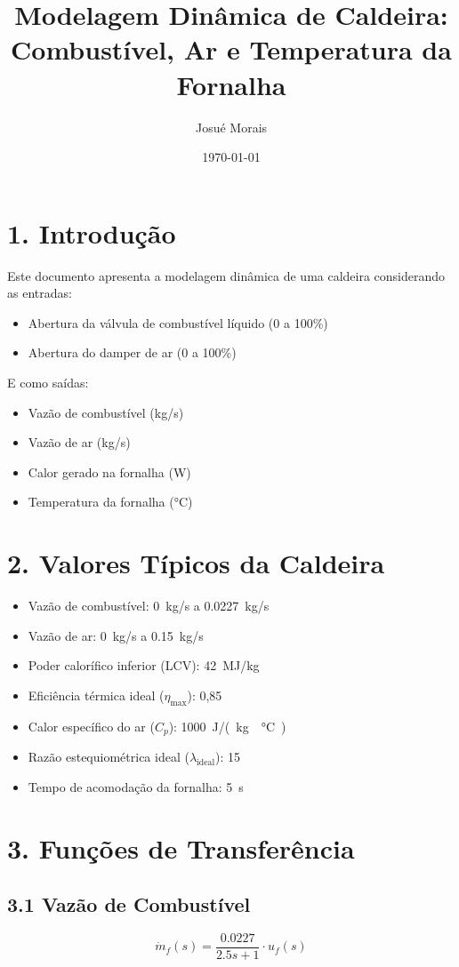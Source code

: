 \documentclass[12pt]{article}
\title{Modelagem Din\^amica de Caldeira: Combust\'ivel, Ar e Temperatura da Fornalha}
\author{Josu\'e Morais}
\date{\today}
\begin{document}
\maketitle

\section*{1. Introdu\c{c}\~ao}
Este documento apresenta a modelagem din\^amica de uma caldeira considerando as entradas:
\begin{itemize}
    \item Abertura da v\'alvula de combust\'ivel l\'iquido (0 a 100\%)
    \item Abertura do damper de ar (0 a 100\%)
\end{itemize}
E como sa\'idas:
\begin{itemize}
    \item Vaz\~ao de combust\'ivel (kg/s)
    \item Vaz\~ao de ar (kg/s)
    \item Calor gerado na fornalha (W)
    \item Temperatura da fornalha (\si{\celsius})
\end{itemize}

\section*{2. Valores T\'ipicos da Caldeira}
\begin{itemize}
    \item Vaz\~ao de combust\'ivel: \SI{0}{kg/s} a \SI{0.0227}{kg/s}
    \item Vaz\~ao de ar: \SI{0}{kg/s} a \SI{0.15}{kg/s}
    \item Poder calor\'ifico inferior (LCV): \SI{42}{MJ/kg}
    \item Efici\^encia t\'ermica ideal (\(\eta_{\text{max}}\)): 0,85
    \item Calor espec\'ifico do ar (\(C_p\)): \SI{1000}{J/(kg\cdot\celsius)}
    \item Raz\~ao estequiom\'etrica ideal (\(\lambda_{\text{ideal}}\)): 15
    \item Tempo de acomoda\c{c}\~ao da fornalha: \SI{5}{s}
\end{itemize}

\section*{3. Fun\c{c}\~oes de Transfer\^encia}
\subsection*{3.1 Vaz\~ao de Combust\'ivel}
\begin{equation}
\dot{m}_f(s) = \frac{0.0227}{2.5s + 1} \cdot u_f(s)
\end{equation}
\end{document}
